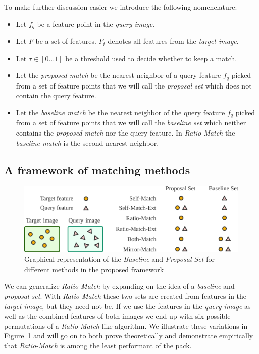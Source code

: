 \documentclass[review]{elsarticle}
\begin{document}
To make further discussion easier we introduce the following nomenclature:
\begin{itemize}
\item{Let $f_q$ be a feature point in the \emph{query image}}.
\item{Let $F$ be a set of features. $F_{t}$ denotes all
        features from the \emph{target image}}.
\item{Let $\tau \in [0 \ldots 1]$ be a threshold used to decide whether 
    to keep a match.} %
\item{Let the \emph{proposed match} be the nearest neighbor of a query 
    feature $f_q$ picked from a set of feature points that we will call 
the \emph{proposal set} which does not contain the query feature}.
\item{Let the \emph{baseline match} be the nearest neighbor of the query 
    feature $f_q$ picked from a set of feature points that we will call 
the \emph{baseline set} which neither contains the \emph{proposed match} 
nor the query feature}. In \emph{Ratio-Match} the \emph{baseline match} is the second nearest neighbor.
\end{itemize}

%
\subsection{A framework of matching methods}
%

\begin{figure}[t]
\centering
\includegraphics[width=0.95\columnwidth]{images/overview-wide}
\caption{Graphical representation of the \emph{Baseline} and 
\emph{Proposal Set} for different methods in the proposed framework}
\label{fig:overview}
\end{figure}

We can generalize \emph{Ratio-Match} by expanding on the idea of a \emph{baseline} and \emph{proposal set}. With \emph{Ratio-Match} these two sets are created from features in the \emph{target image}, but they need not be. If we use the features in the \emph{query image} as well as the combined features of both images we end up with six possible permutations of a \emph{Ratio-Match}-like algorithm. We illustrate these variations in Figure~\ref{fig:overview} and will go on to both prove theoretically and demonstrate empirically that \emph{Ratio-Match} is among the least performant of the pack.
\end{document}

